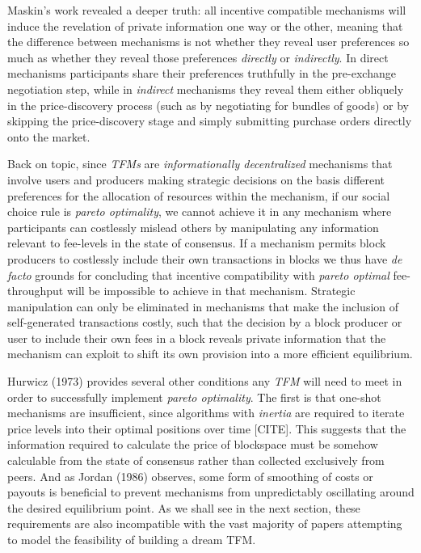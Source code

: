 \documentclass[sigconf,anonymous]{aamas}
\begin{document}
Maskin's work revealed a deeper truth: all incentive compatible mechanisms will induce the revelation of private information one way or the other, meaning that the difference between mechanisms is not whether they reveal user preferences so much as whether they reveal those preferences \textit{directly} or \textit{indirectly}. In direct mechanisms participants share their preferences truthfully in the pre-exchange negotiation step, while in \textit{indirect} mechanisms they reveal them either obliquely in the price-discovery process (such as by negotiating for bundles of goods) or by skipping the price-discovery stage and simply submitting purchase orders directly onto the market.

Back on topic, since \textit{TFMs} are \textit{informationally decentralized} mechanisms that involve users and producers making strategic decisions on the basis different preferences for the allocation of resources within the mechanism, if our social choice rule is \textit{pareto optimality}, we cannot achieve it in any mechanism where participants can costlessly mislead others by manipulating any information relevant to fee-levels in the state of consensus. If a mechanism permits block producers to costlessly include their own transactions in blocks we thus have \textit{de facto} grounds for concluding that incentive compatibility with \textit{pareto optimal} fee-throughput will be impossible to achieve in that mechanism. Strategic manipulation can only be eliminated in mechanisms that make the inclusion of self-generated transactions costly, such that the decision by a block producer or user to include their own fees in a block reveals private information that the mechanism can exploit to shift its own provision into a more efficient equilibrium.

Hurwicz (1973) provides several other conditions any \textit{TFM} will need to meet in order to successfully implement \textit{pareto optimality}. The first is that one-shot mechanisms are insufficient, since algorithms with \textit{inertia} are required to iterate price levels into their optimal positions over time [CITE]. This suggests that the information required to calculate the price of blockspace must be somehow calculable from the state of consensus rather than collected exclusively from peers. And as Jordan (1986) observes, some form of smoothing of costs or payouts is beneficial to prevent mechanisms from unpredictably oscillating around the desired equilibrium point. As we shall see in the next section, these requirements are also incompatible with the vast majority of papers attempting to model the feasibility of building a dream TFM. 
\end{document}
